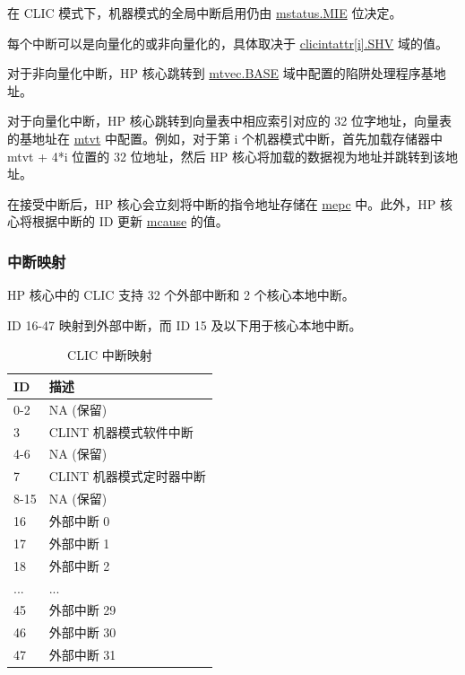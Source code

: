 \documentclass[main\_\_CN.tex]{subfiles}
\begin{document}
在 CLIC 模式下，机器模式的全局中断启用仍由 \hyperref[fielddesc:MSTATUSMIE]{mstatus.MIE} 位决定。


每个中断可以是向量化的或非向量化的，具体取决于 \hyperref[fielddesc:MCLICINTATTR_i_SHV]{clicintattr[i].SHV} 域的值。

对于非向量化中断，HP 核心跳转到 \hyperref[fielddesc:MTVECBASE]{mtvec.BASE} 域中配置的陷阱处理程序基地址。

对于向量化中断，HP 核心跳转到向量表中相应索引对应的 32 位字地址，向量表的基地址在 \hyperref[regdesc:MTVT]{mtvt} 中配置。例如，对于第 i 个机器模式中断，首先加载存储器中 mtvt + 4*i 位置的 32 位地址，然后 HP 核心将加载的数据视为地址并跳转到该地址。

在接受中断后，HP 核心会立刻将中断的指令地址存储在 \hyperref[regdesc:MEPC]{mepc} 中。此外，HP 核心将根据中断的 ID 更新 \hyperref[regdesc:MCAUSE]{mcause} 的值。


\hypertarget{riscvcpu-clic-intmap}{}
\subsubsection{中断映射}
\label{sec:riscvcpu-clic-intmap}

HP 核心中的 CLIC 支持 32 个外部中断和 2 个核心本地中断。

ID 16-47 映射到外部中断，而 ID 15 及以下用于核心本地中断。

\begin{longtable}{ | l | l | }
\caption{CLIC 中断映射}
\label{tab:riscvcpu-clic-intmap-table}
\\ \hline
\rowcolor{lightgray}
ID & 描述 \\ \hline
0-2 & NA (保留) \\ \hline
3 & CLINT 机器模式软件中断 \\ \hline
4-6 & NA (保留) \\ \hline
7 & CLINT 机器模式定时器中断 \\ \hline
8-15 & NA (保留) \\ \hline
16 & 外部中断 0 \\ \hline
17 & 外部中断 1 \\ \hline
18 & 外部中断 2 \\ \hline
... & ... \\ \hline
45 & 外部中断 29 \\ \hline
46 & 外部中断 30 \\ \hline
47 & 外部中断 31 \\ \hline
\end{longtable}
\end{document}
